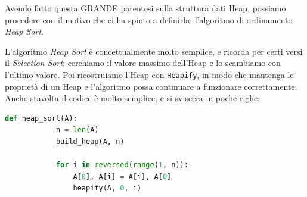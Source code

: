 \documentclass[12pt]{report}
\begin{document}
    Avendo fatto questa GRANDE parentesi sulla struttura dati Heap, possiamo procedere con il motivo che ci ha spinto a definirla: l'algoritmo di ordinamento \textit{Heap Sort}.
    	
    L'algoritmo \textit{Heap Sort} è concettualmente molto semplice, e ricorda per certi versi il \textit{Selection Sort}: cerchiamo il valore massimo dell'Heap e lo scambiamo con l'ultimo valore. Poi ricostruiamo l'Heap con \texttt{Heapify}, in modo che mantenga le proprietà di un Heap e l'algoritmo possa continuare a funzionare correttamente.	
    Anche stavolta il codice è molto semplice, e si sviscera in poche righe:
    	
    \begin{lstlisting}[language=Python, caption={Codice dell'algoritmo Heap Sort}]
    	def heap_sort(A):
    		n = len(A)
    		build_heap(A, n)
    		
    		for i in reversed(range(1, n)):
    			A[0], A[i] = A[i], A[0]
    			heapify(A, 0, i)
    		
    \end{lstlisting}
    	
\end{document}
